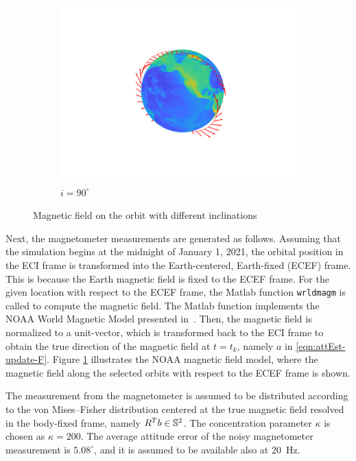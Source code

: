 \begin{figure}
\begin{subfigure}[b]{0.28\textwidth}
		\includegraphics[trim={4.5cm 2.5cm 4cm 2.5cm},clip,width=1\textwidth]{figures/attEst-sim3-mag_90.png}
		\caption{$i=90^\circ$}
	\end{subfigure}
	\caption{Magnetic field on the orbit with different inclinations}
	\label{fig:attEst-sim3-magnetic}
\end{figure}

Next, the magnetometer measurements are generated as follows. 
Assuming that the simulation begins at the midnight of January 1, 2021, the orbital position in the ECI frame is transformed into the Earth-centered, Earth-fixed (ECEF) frame. 
This is because the Earth magnetic field is fixed to the ECEF frame. 
For the given location with respect to the ECEF frame, the Matlab function \texttt{wrldmagm} is called to compute the magnetic field.  
The Matlab function implements the NOAA World Magnetic Model presented in~\cite{chulliat2020us}. 
Then, the magnetic field is normalized to a unit-vector, which is transformed back to the ECI frame to obtain the true direction of the magnetic field at $t=t_k$, namely $a$ in \eqref{eqn:attEst-update-F}.
Figure \ref{fig:attEst-sim3-magnetic} illustrates the NOAA magnetic field model, where the magnetic field along the selected orbits with respect to the ECEF frame is shown.

The measurement from the magnetometer is assumed to be distributed according to the von Mises--Fisher distribution centered at the true magnetic field resolved in the body-fixed frame, namely $R^Tb\in\mathbb{S}^2$.
The concentration parameter $\kappa$ is chosen as $\kappa=200$. 
The average attitude error of the noisy magnetometer measurement is $5.08^\circ$, and it is assumed to be available also at \SI{20}{\hertz}.


